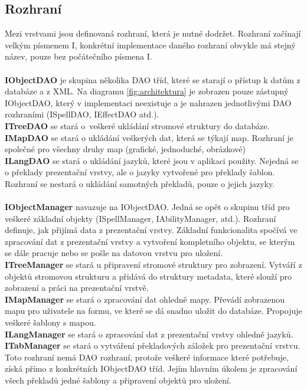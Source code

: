 \documentclass[thesis=B,czech]{resources/FITthesis}[2012/06/26]
\begin{document}
\subsection{Rozhraní}
Mezi vrstvami jsou definovaná rozhraní, která je nutné dodržet. Rozhraní začínají velkým písmenem I, konkrétní implementace daného rozhraní obvykle má stejný název, pouze bez počátečního písmena I.\\
\\
\textbf{IObjectDAO} je skupina několika DAO tříd, které se starají o přístup k datům z databáze a z XML. Na diagramu \ref{fig:architektura} je zobrazen pouze zástupný IObjectDAO, který v implementaci neexistuje a je nahrazen jednotlivými DAO rozhraními (ISpellDAO, IEffectDAO atd.).\\
\textbf{ITreeDAO} se stará o~veškeré ukládání stromové struktury do databáze. \\
\textbf{IMapDAO} se stará o ukládání veškerých dat, která se týkají map. Rozhraní je společné pro všechny druhy map (grafické, jednoduché, obrázkové)\\
\textbf{ILangDAO} se stará o ukládání jazyků, které jsou v aplikaci použity. Nejedná se o překlady prezentační vrstvy, ale o jazyky vytvořené pro překlady šablon. Rozhraní se nestará o ukládání samotných překladů, pouze o jejich jazyky.\\
\\
\textbf{IObjectManager} navazuje na IObjectDAO. Jedná se opět o skupinu tříd pro veškeré základní objekty (ISpellManager, IAbilityManager, atd.). Rozhraní definuje, jak přijímá data z prezentační vrstvy. Základní funkcionalita spočívá ve zpracování dat z prezentační vrstvy a vytvoření kompletního objektu, se kterým se dále pracuje nebo se pošle na datovou vrstvu pro uložení.\\
\textbf{ITreeManager} se stará u připravení stromové struktury pro zobrazení. Vytváří z objektů stromovou strukturu a přidává do struktury metadata, které slouží pro zobrazení a práci na prezentační vrstvě.\\
\textbf{IMapManager} se stará o zpracování dat ohledně mapy. Převádí zobrazenou mapu pro uživatele na formu, ve které se dá snadno uložit do databáze. Propojuje veškeré šablony s mapou.\\
\textbf{ILangManager} se stará o zpracování dat z prezentační vrstvy ohledně jazyků.\\
\textbf{ITabManager} se stará o vytváření překladových záložek pro prezentační vrstvu. Toto rozhraní nemá DAO rozhraní, protože veškeré informace které potřebuje, získá přímo z konkrétních IObjectDAO tříd. Jejím hlavním úkolem je zpracování všech překladů jedné šablony a připravení objektů pro uložení.\\
\end{document}
